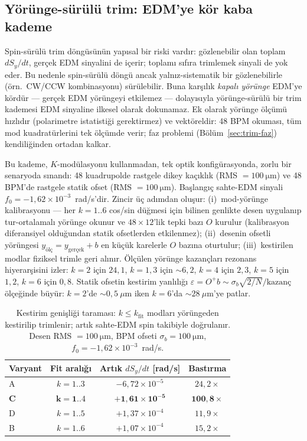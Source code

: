 \documentclass[preprint,12pt]{elsarticle}
\begin{document}
\subsection{Yörünge-sürülü trim: EDM'ye kör kaba kademe}
\label{sec:trim-orbit}

Spin-sürülü trim döngüsünün yapısal bir riski vardır: gözlenebilir olan
toplam $dS_y/dt$, gerçek EDM sinyalini de içerir; toplamı sıfıra
trimlemek sinyali de yok eder. Bu nedenle spin-sürülü döngü ancak
yalnız-sistematik bir gözlenebilirle (örn.\ CW/CCW kombinasyonu)
sürülebilir. Buna karşılık \emph{kapalı yörünge} EDM'ye kördür — gerçek
EDM yörüngeyi etkilemez — dolayısıyla yörünge-sürülü bir trim kademesi
EDM sinyaline ilkesel olarak dokunamaz. Ek olarak yörünge ölçümü
hızlıdır (polarimetre istatistiği gerektirmez) ve vektöreldir: 48 BPM
okuması, tüm mod kuadratürlerini tek ölçümde verir; faz problemi
(Bölüm~\ref{sec:trim-faz}) kendiliğinden ortadan kalkar.

Bu kademe, $K$-modülasyonu kullanmadan, tek optik konfigürasyonda,
zorlu bir senaryoda sınandı: 48 kuadrupolde rastgele dikey kaçıklık
(RMS $=\SI{100}{\micro\meter}$) ve 48 BPM'de rastgele statik ofset
(RMS $=\SI{100}{\micro\meter}$). Başlangıç sahte-EDM sinyali
$f_0=-1{,}62\times10^{-3}$~rad/s'dir. Zincir üç adımdan oluşur:
(i)~mod-yörünge kalibrasyonu — her $k=1..6$ cos/sin düğmesi için
bilinen genlikte desen uygulanıp tur-ortalamalı yörünge okunur ve
$48{\times}12$'lik tepki bazı $O$ kurulur (kalibrasyon diferansiyel
olduğundan statik ofsetlerden etkilenmez); (ii)~desenin ofsetli
yörüngesi $y_\mathrm{ölç}=y_\mathrm{gerçek}+b$ en küçük karelerle $O$
bazına oturtulur; (iii)~kestirilen modlar fiziksel trimle geri alınır.
Ölçülen yörünge kazançları rezonans hiyerarşisini izler: $k=2$ için
$24{,}1$, $k=1,3$ için $\sim6{,}2$, $k=4$ için $2{,}3$, $k=5$ için
$1{,}2$, $k=6$ için $0{,}8$. Statik ofsetin kestirim yanlılığı
$\varepsilon=O^{+}b\sim\sigma_b\sqrt{2/N}/\mathrm{kazanç}$ ölçeğinde
büyür: $k=2$'de $\sim0{,}5~\mu$m iken $k=6$'da $\sim28~\mu$m'ye patlar.

\begin{table}[h]
\centering
\caption{Kestirim genişliği taraması: $k\le k_\mathrm{fit}$ modları
yörüngeden kestirilip trimlenir; artık sahte-EDM spin takibiyle
doğrulanır. Desen RMS $=\SI{100}{\micro\meter}$, BPM ofseti
$\sigma_b=\SI{100}{\micro\meter}$, $f_0=-1{,}62\times10^{-3}$~rad/s.}
\label{tab:orbit-trim}
\begin{tabular}{lccc}
\toprule
Varyant & Fit aralığı & Artık $dS_y/dt$ [rad/s] & Bastırma \\
\midrule
A & $k=1..3$ & $-6{,}72\times10^{-5}$ & $24{,}2\times$ \\
\textbf{C} & $\mathbf{k=1..4}$ & $\mathbf{+1{,}61\times10^{-5}}$ & $\mathbf{100{,}8\times}$ \\
D & $k=1..5$ & $+1{,}37\times10^{-4}$ & $11{,}9\times$ \\
B & $k=1..6$ & $+1{,}07\times10^{-4}$ & $15{,}2\times$ \\
\bottomrule
\end{tabular}
\end{table}
\end{document}

